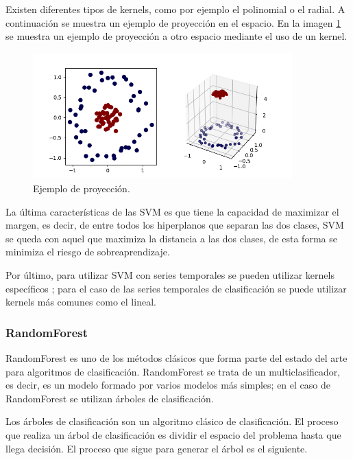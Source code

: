 Existen diferentes tipos de kernels, como por ejemplo el polinomial o el radial. A continuación se muestra un ejemplo de proyección en el espacio. En la imagen \ref{fig:215} se muestra un ejemplo de proyección a otro espacio mediante el uso de un kernel.\newline

\begin{figure}[H]
	\centering
	\includegraphics[width=100mm]{imagenes/svm_kernel_example.png}
	\caption{Ejemplo de proyección.}
	\label{fig:215}
\end{figure}
\verticalspace

La última características de las SVM es que tiene la capacidad
de maximizar el margen, es decir, de entre todos los hiperplanos que separan las dos clases, SVM se queda con aquel que maximiza la distancia a las dos clases, de esta forma se minimiza el riesgo de sobreaprendizaje.\newline

Por último, para utilizar SVM con series temporales se pueden utilizar kernels específicos \cite{shimodaira2002dynamic}; para el caso de las series temporales de clasificación se puede utilizar kernels más comunes como el lineal.\newline

\subsubsection{RandomForest}
RandomForest \cite{breiman2001random} es uno de los métodos clásicos que forma parte del estado del arte para algoritmos de clasificación. RandomForest se trata de un multiclasificador, es decir, es un modelo formado por varios modelos más simples; en el caso de RandomForest se utilizan árboles de clasificación.\newline

Los árboles de clasificación son un algoritmo clásico de clasificación. El proceso que realiza un árbol de clasificación es dividir el espacio del problema hasta que llega decisión. El proceso que sigue para generar el árbol es el siguiente.\newline

